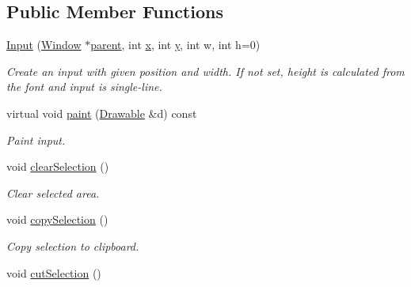 \subsection*{Public Member Functions}
\begin{DoxyCompactItemize}
\item 
\hypertarget{classGUI_1_1Input_acf596747bc99bee86e0ad0cd4f0b3a7e}{\hyperlink{classGUI_1_1Input_acf596747bc99bee86e0ad0cd4f0b3a7e}{Input} (\hyperlink{classGUI_1_1Window}{Window} $\ast$\hyperlink{classGUI_1_1Window_a2e593ff65e7702178d82fe9010a0b539}{parent}, int \hyperlink{classGUI_1_1Window_a6ca6a80ca00c9e1d8ceea8d3d99a657d}{x}, int \hyperlink{classGUI_1_1Window_a0ee8e923aff2c3661fc2e17656d37adf}{y}, int w, int h=0)}\label{classGUI_1_1Input_acf596747bc99bee86e0ad0cd4f0b3a7e}

\begin{DoxyCompactList}\small\item\em Create an input with given position and width. If not set, height is calculated from the font and input is single-\/line. \end{DoxyCompactList}\item 
\hypertarget{classGUI_1_1Input_ae4b2d3f5c51b4403c115424810fb0c27}{virtual void \hyperlink{classGUI_1_1Input_ae4b2d3f5c51b4403c115424810fb0c27}{paint} (\hyperlink{classGUI_1_1Drawable}{Drawable} \&d) const }\label{classGUI_1_1Input_ae4b2d3f5c51b4403c115424810fb0c27}

\begin{DoxyCompactList}\small\item\em Paint input. \end{DoxyCompactList}\item 
\hypertarget{classGUI_1_1Input_a448b6c9fba78ca6408d64e534d2f3162}{void \hyperlink{classGUI_1_1Input_a448b6c9fba78ca6408d64e534d2f3162}{clear\-Selection} ()}\label{classGUI_1_1Input_a448b6c9fba78ca6408d64e534d2f3162}

\begin{DoxyCompactList}\small\item\em Clear selected area. \end{DoxyCompactList}\item 
\hypertarget{classGUI_1_1Input_ad00afd73ff9f569e3b577e2edd7d545d}{void \hyperlink{classGUI_1_1Input_ad00afd73ff9f569e3b577e2edd7d545d}{copy\-Selection} ()}\label{classGUI_1_1Input_ad00afd73ff9f569e3b577e2edd7d545d}

\begin{DoxyCompactList}\small\item\em Copy selection to clipboard. \end{DoxyCompactList}\item 
\hypertarget{classGUI_1_1Input_a56bc63e85caef450a3401578657907cc}{void \hyperlink{classGUI_1_1Input_a56bc63e85caef450a3401578657907cc}{cut\-Selection} ()}\label{classGUI_1_1Input_a56bc63e85caef450a3401578657907cc}


\end{DoxyCompactItemize}
